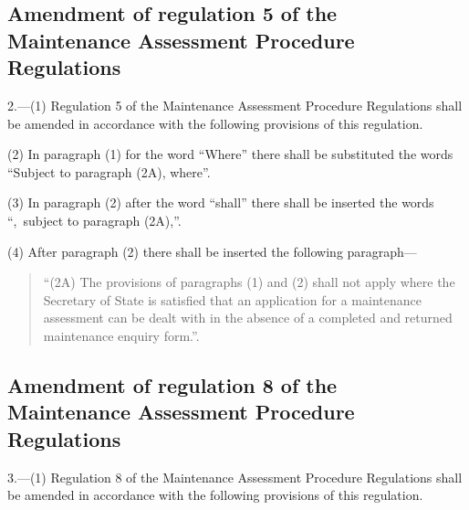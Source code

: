 \documentclass[12pt,a4paper]{article}
\begin{document}
\subsection[2. Amendment of regulation 5 of the Maintenance Assessment Procedure Regulations]{Amendment of regulation 5 of the Maintenance Assessment Procedure Regulations}

2.—(1) Regulation 5 of the Maintenance Assessment Procedure Regulations shall be amended in accordance with the following provisions of this regulation.

(2) In paragraph (1) for the word “Where” there shall be substituted the words “Subject to paragraph (2A), where”.

(3) In paragraph (2) after the word “shall” there shall be inserted the words “,~subject to paragraph (2A),”.

(4) After paragraph (2) there shall be inserted the following paragraph---
\begin{quotation}
“(2A) The provisions of paragraphs (1) and (2) shall not apply where the Secretary of State is satisfied that an application for a maintenance assessment can be dealt with in the absence of a completed and returned maintenance enquiry form.”.
\end{quotation}

\subsection[3. Amendment of regulation 8 of the Maintenance Assessment Procedure Regulations]{Amendment of regulation 8 of the Maintenance Assessment Procedure Regulations}

3.—(1) Regulation 8 of the Maintenance Assessment Procedure Regulations shall be amended in accordance with the following provisions of this regulation.
\end{document}
